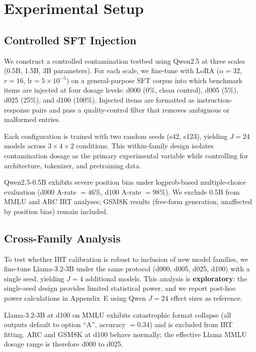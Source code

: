 \section{Experimental Setup}
\label{sec:experiments}

\subsection{Controlled SFT Injection}
\label{sec:injection}

We construct a controlled contamination testbed using Qwen2.5 at three scales (0.5B, 1.5B, 3B parameters). For each scale, we fine-tune with LoRA ($\alpha=32$, $r=16$, lr$=5\times10^{-5}$) on a general-purpose SFT corpus into which benchmark items are injected at four dosage levels: d000 (0\%, clean control), d005 (5\%), d025 (25\%), and d100 (100\%). Injected items are formatted as instruction-response pairs and pass a quality-control filter that removes ambiguous or malformed entries.

Each configuration is trained with two random seeds (s42, s123), yielding $J=24$ models across $3 \times 4 \times 2$ conditions. This within-family design isolates contamination dosage as the primary experimental variable while controlling for architecture, tokenizer, and pretraining data.

Qwen2.5-0.5B exhibits severe position bias under logprob-based multiple-choice evaluation (d000 A-rate $=46\%$, d100 A-rate $=98\%$). We exclude 0.5B from MMLU and ARC IRT analyses; GSM8K results (free-form generation, unaffected by position bias) remain included.

\subsection{Cross-Family Analysis}
\label{sec:cross_family}

To test whether IRT calibration is robust to inclusion of new model families, we fine-tune Llama-3.2-3B under the same protocol (d000, d005, d025, d100) with a single seed, yielding $J=4$ additional models. This analysis is \textbf{exploratory}: the single-seed design provides limited statistical power, and we report post-hoc power calculations in Appendix~E using Qwen $J=24$ effect sizes as reference.

Llama-3.2-3B at d100 on MMLU exhibits catastrophic format collapse (all outputs default to option ``A'', accuracy $=0.34$) and is excluded from IRT fitting. ARC and GSM8K at d100 behave normally; the effective Llama MMLU dosage range is therefore d000 to d025.

